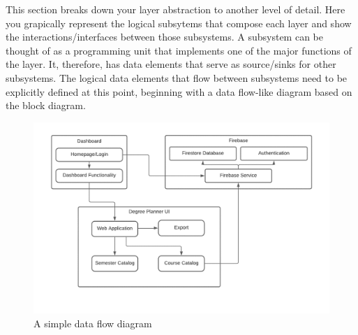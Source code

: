 This section breaks down your layer abstraction to another level of detail. Here you grapically represent the logical subsytems that compose each layer and show the interactions/interfaces between those subsystems. A subsystem can be thought of as a programming unit that implements one of the major functions of the layer. It, therefore, has data elements that serve as source/sinks for other subsystems. The logical data elements that flow between subsystems need to be explicitly defined at this point, beginning with a data flow-like diagram based on the block diagram.

\begin{figure}[h!]
	\centering
 	\includegraphics[width=\textwidth]{images/ADSDiagram}
 \caption{A simple data flow diagram}
\end{figure}
